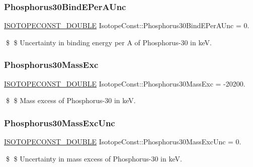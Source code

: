 \subsubsection{\texorpdfstring{Phosphorus30\+Bind\+E\+Per\+A\+Unc}{Phosphorus30BindEPerAUnc}}
{\footnotesize\ttfamily \mbox{\hyperlink{group___isotope_const-_macros_ga8f45a7272ce02c0b4c65c44636ed719a}{I\+S\+O\+T\+O\+P\+E\+C\+O\+N\+S\+T\+\_\+\+D\+O\+U\+B\+LE}} Isotope\+Const\+::\+Phosphorus30\+Bind\+E\+Per\+A\+Unc = 0.}

\$ \$ Uncertainty in binding energy per A of Phosphorus-\/30 in keV. \mbox{\label{group___isotope_const-_phosphorus-_p30_gab1250cfdc19dc2515e206179125e9126}} 
\subsubsection{\texorpdfstring{Phosphorus30\+Mass\+Exc}{Phosphorus30MassExc}}
{\footnotesize\ttfamily \mbox{\hyperlink{group___isotope_const-_macros_ga8f45a7272ce02c0b4c65c44636ed719a}{I\+S\+O\+T\+O\+P\+E\+C\+O\+N\+S\+T\+\_\+\+D\+O\+U\+B\+LE}} Isotope\+Const\+::\+Phosphorus30\+Mass\+Exc = -\/20200.}

\$ \$ Mass excess of Phosphorus-\/30 in keV. \mbox{\label{group___isotope_const-_phosphorus-_p30_ga34d592352ef18edc4dd5711e18796ee3}} 
\subsubsection{\texorpdfstring{Phosphorus30\+Mass\+Exc\+Unc}{Phosphorus30MassExcUnc}}
{\footnotesize\ttfamily \mbox{\hyperlink{group___isotope_const-_macros_ga8f45a7272ce02c0b4c65c44636ed719a}{I\+S\+O\+T\+O\+P\+E\+C\+O\+N\+S\+T\+\_\+\+D\+O\+U\+B\+LE}} Isotope\+Const\+::\+Phosphorus30\+Mass\+Exc\+Unc = 0.}

\$ \$ Uncertainty in mass excess of Phosphorus-\/30 in keV. \mbox{\label{group___isotope_const-_phosphorus-_p30_ga4a39b7058ca5f3bd01a4b2bb37f19c22}} 
